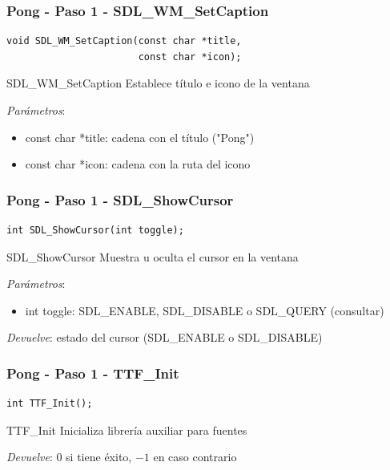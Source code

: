 \begin{frame}[fragile]
    \frametitle{Pong - Paso 1 - SDL\_WM\_SetCaption}
	
\begin{verbatim}
void SDL_WM_SetCaption(const char *title,
                       const char *icon);
\end{verbatim}

    \begin{block}{SDL\_WM\_SetCaption}
	Establece título e icono de la ventana
	
	\emph{Parámetros}:
	\begin{itemize}
	    \item const char *title: cadena con el título ("Pong")
	    \item const char *icon: cadena con la ruta del icono
	\end{itemize}
    \end{block}

\end{frame}

\begin{frame}[fragile]
    \frametitle{Pong - Paso 1 - SDL\_ShowCursor}
	
\begin{verbatim}
int SDL_ShowCursor(int toggle);
\end{verbatim}

    \begin{block}{SDL\_ShowCursor}
	Muestra u oculta el cursor en la ventana
	
	\emph{Parámetros}:
	\begin{itemize}
	    \item int toggle: SDL\_ENABLE, SDL\_DISABLE o SDL\_QUERY (consultar)
	\end{itemize}
	
	\emph{Devuelve}: estado del cursor (SDL\_ENABLE o SDL\_DISABLE)
    \end{block}

\end{frame}

\begin{frame}[fragile]
    \frametitle{Pong - Paso 1 - TTF\_Init}
	
\begin{verbatim}
int TTF_Init();
\end{verbatim}

    \begin{block}{TTF\_Init}
	Inicializa librería auxiliar para fuentes
	
	\emph{Devuelve}: $0$ si tiene éxito, $-1$ en caso contrario
    \end{block}

\end{frame}


